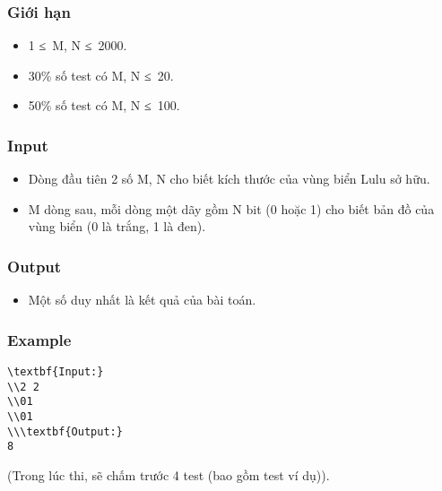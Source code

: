 \subsubsection{   Giới hạn  }
\begin{itemize}
	\item     1 ≤ M, N ≤ 2000.   
	\item     30\% số test có M, N ≤ 20.   
	\item     50\% số test có M, N ≤ 100.   
\end{itemize}
\begin{itemize}
\end{itemize}

\subsubsection{   Input  }
\begin{itemize}
	\item     Dòng đầu tiên 2 số M, N cho biết kích thước của vùng biển Lulu sở hữu.   
	\item     M dòng sau, mỗi dòng một dãy gồm N bit (0 hoặc 1) cho biết bản đồ của vùng biển (0 là trắng, 1 là đen).   
\end{itemize}

\subsubsection{   Output  }
\begin{itemize}
	\item     Một số duy nhất là kết quả của bài toán.   
\end{itemize}
\begin{itemize}
\end{itemize}

\subsubsection{   Example  }
\begin{verbatim}
\textbf{Input:}
\\2 2
\\01
\\01
\\\textbf{Output:}
8\end{verbatim}

(Trong lúc thi, sẽ chấm trước 4 test (bao gồm test ví dụ)).
